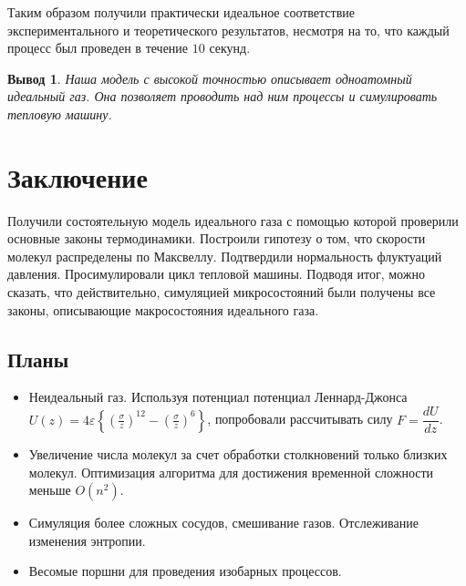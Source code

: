 \documentclass[twoside,twocolumn, 11pt]{article}
\theoremstyle{plain}
\newtheorem{conclusion}{Вывод}
\theoremstyle{definition}
\begin{document}
Таким образом получили практически идеальное соответствие экспериментального и теоретического результатов, несмотря на то, что
каждый процесс был проведен в течение $10$ секунд.

\begin{conclusion}
Наша модель с высокой точностью описывает одноатомный идеальный газ. Она позволяет проводить над ним процессы и симулировать тепловую машину.
\end{conclusion}

\section{Заключение}
\indent Получили состоятельную модель идеального газа с помощью которой проверили основные законы термодинамики. Построили гипотезу о том,
что скорости молекул распределены по Максвеллу. Подтвердили нормальность флуктуаций давления. Просимулировали цикл тепловой машины.
Подводя итог, можно сказать, что действительно, симуляцией микросостояний были получены все законы, описывающие макросостояния идеального газа.

\subsection{Планы}
\begin{itemize}
\item Неидеальный газ.
Используя потенциал потенциал Леннард-Джонса $ U(z)=4 \varepsilon\left\{\left(\frac{\sigma}{z}\right)^{12}-\left(\frac{\sigma}{z}\right)^{6}\right\}$, попробовали
рассчитывать силу $F = \dfrac{dU}{dz}$.
\item Увеличение числа молекул за счет обработки столкновений только близких молекул. Оптимизация алгоритма для достижения временной сложности меньше $O(n^2)$.
\item Симуляция более сложных сосудов, смешивание газов. Отслеживание изменения энтропии.
\item Весомые поршни для проведения изобарных процессов.
\end{itemize}

\end{document}

